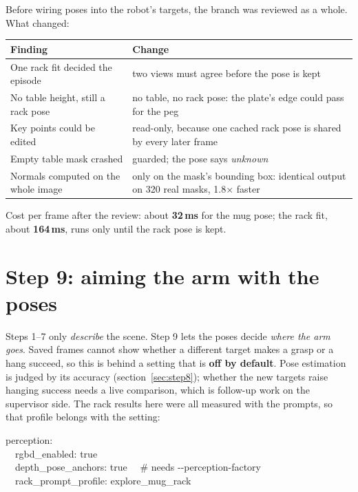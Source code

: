 \documentclass[11pt,a4paper]{article}
\newcommand{\code}[1]{\texttt{\detokenize{#1}}}
\begin{document}
Before wiring poses into the robot's targets, the branch was reviewed as a whole. What changed:

\begin{center}
\small
\begin{tabularx}{\textwidth}{@{}>{\raggedright\arraybackslash}p{4.2cm}X@{}}
\toprule
Finding & Change \\
\midrule
One rack fit decided the episode & two views must agree before the pose is kept \\
No table height, still a rack pose & no table, no rack pose: the plate's edge could pass for the peg \\
Key points could be edited & read-only, because one cached rack pose is shared by every later frame \\
Empty table mask crashed & guarded; the pose says \emph{unknown} \\
Normals computed on the whole image & only on the mask's bounding box: identical output on 320 real masks, 1.8$\times$ faster \\
\bottomrule
\end{tabularx}
\end{center}
Cost per frame after the review: about \textbf{32\,ms} for the mug pose; the rack fit, about
\textbf{164\,ms}, runs only until the rack pose is kept.

\section{Step 9: aiming the arm with the poses}\label{sec:step9}

Steps 1--7 only \emph{describe} the scene. Step 9 lets the poses decide \emph{where the arm
goes}. Saved frames cannot show whether a different target makes a grasp or a hang succeed,
so this is behind a setting that is \textbf{off by default}. Pose estimation is judged by its
accuracy (section~\ref{sec:step8}); whether the new targets raise hanging success needs a live
comparison, which is follow-up work on the supervisor side. The rack results here were all
measured with the \code{explore_mug_rack} prompts, so that profile belongs with the setting:

\begin{cmd}
perception:\\
\ \ rgbd\_enabled: true\\
\ \ depth\_pose\_anchors: true \ \ \# needs -{}-perception-factory\\
\ \ rack\_prompt\_profile: explore\_mug\_rack
\end{cmd}
\end{document}
